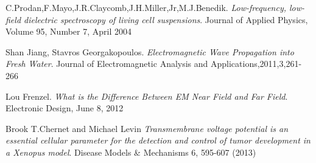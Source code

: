 \documentclass[journal]{IEEEtran}
\begin{document}
\begin{thebibliography}{9}

C.Prodan,F.Mayo,J.R.Claycomb,J.H.Miller,Jr,M.J.Benedik.
\textit{Low-frequency, low-field dielectric spectroscopy of living cell suspensions}.
Journal of Applied Physics, Volume 95, Number 7, April 2004

Shan Jiang, Stavros Georgakopoulos.
\textit{Electromagnetic Wave Propagation into Fresh Water}.
Journal of Electromagnetic Analysis and Applications,2011,3,261-266

Lou Frenzel.
\textit{What is the Difference Between EM Near Field and Far Field}.
Electronic Design, June 8, 2012

Brook T.Chernet and Michael Levin
\textit{Transmembrane voltage potential is an essential cellular parameter for the detection and control of tumor development in a Xenopus model}. 
Disease Models & Mechanisms 6, 595-607 (2013)

\end{thebibliography}
\end{document}
